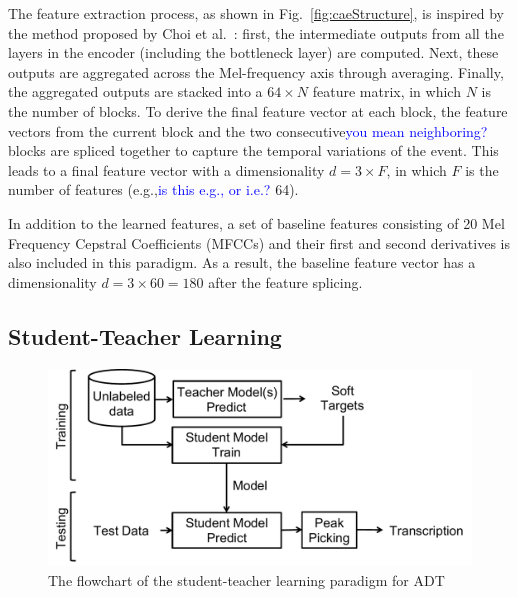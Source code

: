 \documentclass{article}
\newcommand{\comment}[1]{{\textcolor{blue}{#1}}}
\begin{document}
The feature extraction process, as shown in Fig.~\ref{fig:caeStructure}, is inspired by the method proposed by Choi et al.~\cite{Choi2017a}: first, the intermediate outputs from all the layers in the encoder (including the bottleneck layer) are computed. Next, these outputs are aggregated across the Mel-frequency axis through averaging. Finally, the aggregated outputs are stacked into a $64 \times N$ feature matrix, in which $N$ is the number of blocks.
To derive the final feature vector at each block, the feature vectors from the current block and the two consecutive\comment{you mean neighboring?} blocks are spliced together to capture the temporal variations of the event. This leads to a final feature vector with a dimensionality $d = 3 \times F$, in which $F$ is the number of features (e.g.,\comment{is this e.g., or i.e.?} 64). 

In addition to the learned features, a set of baseline features consisting of 20 Mel Frequency Cepstral Coefficients (MFCCs) and their first and second derivatives is also included in this paradigm. As a result, the baseline feature vector has a dimensionality $d = 3 \times 60 = 180$ after the feature splicing. 

\subsection{Student-Teacher Learning}
\label{subsec:studentTeacher}

\begin{figure}
\centering
\includegraphics[width = \columnwidth]{./figs/studentTeacherSys.pdf}
\caption{The flowchart of the student-teacher learning paradigm for ADT}
\label{fig:studentTeacherFlow}
\end{figure}
\end{document}
